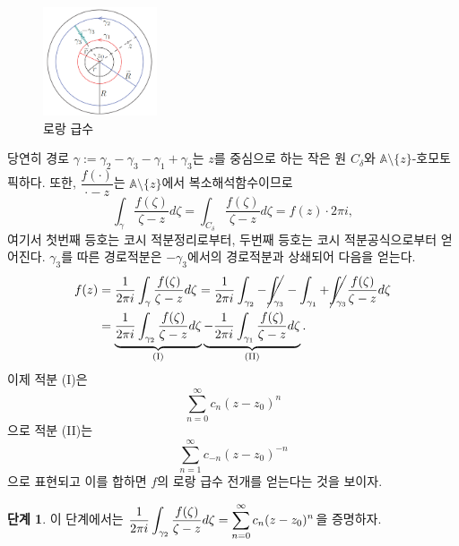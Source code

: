 \begin{figure}[h!]
\begin{center}
\includegraphics[width=0.3\textwidth]{./SaltChapter/figs/fig-4-2}
\end{center}
\caption{로랑 급수}
\label{fig-4-2}
\end{figure}

당연히
경로 $\gamma := \gamma_2 - \gamma_3 - \gamma_1 + \gamma_3$는
$z$를 중심으로 하는 작은 원 $C_\delta$와 $\mathbb A\setminus \{z\}$-호모토픽하다.
또한, $\dfrac{f(\cdot)}{\cdot-z}$는 $\mathbb A\setminus \{z\}$에서
복소해석함수이므로
\[
\int_\gamma \dfrac{f(\zeta)}{\zeta-z} d\zeta
= \int_{C_\delta} \dfrac{f(\zeta)}{\zeta-z} d\zeta
= f(z) \cdot 2\pi i,
\]
여기서 첫번째 등호는 코시 적분정리로부터,
두번째 등호는 코시 적분공식으로부터 얻어진다.
$\gamma_3$를 따른 경로적분은 $-\gamma_3$에서의 경로적분과 상쇄되어 다음을 얻는다.
\begin{align*}
f(z) &= \dfrac1{2\pi i} \int_\gamma \dfrac{f(\zeta)}{\zeta-z}d\zeta
= \dfrac1{2\pi i} \int_{\gamma_2} - \cancel{ \int_{\gamma_3}}
-  \int_{\gamma_1} + \cancel{\int_{\gamma_3 }}\dfrac{f(\zeta)}{\zeta-z}d\zeta \\
&= \underbrace{\dfrac1{2\pi i} \int_{\gamma_2} \dfrac{f(\zeta)}{\zeta-z}d\zeta}_{\text{(I)}}
\underbrace{-\dfrac1{2\pi i} \int_{\gamma_1} \dfrac{f(\zeta)}{\zeta-z}d\zeta}_{\text{(II)}}.
\end{align*}
이제 적분 (I)은
\[
\sum_{n=0}^\infty c_n(z-z_0)^n
\]
으로 적분 (II)는 
\[
\sum_{n=1}^\infty c_{-n}(z-z_0)^{-n}
\]
으로 표현되고 이를 합하면 $f$의 로랑 급수 전개를 얻는다는 것을 보이자.

{\bf 단계 1}.
이 단계에서는 $\dfrac1{2\pi i} \dint_{\gamma_2} \dfrac{f(\zeta)}{\zeta-z}d\zeta
= \Sum_{n=0}^\infty c_n(z-z_0)^n$을 증명하자.

